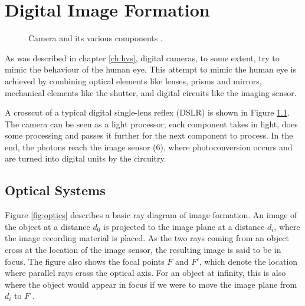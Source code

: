 \chapter{Digital Image Formation}
\label{ch:dif}

\begin{figure}
    \centering
    \caption{Camera and its various components \cite{cameracrosscut}.}
    \label{fig:camera}
\end{figure}

As was described in chapter \ref{ch:hvs}, digital cameras, to some extent, try to mimic the behaviour of the human eye. This attempt to mimic the human eye is achieved by combining optical elements like lenses, prisms and mirrors, mechanical elements like the shutter, and digital circuits like the imaging sensor. 

A crosscut of a typical digital single-lens reflex (DSLR) is shown in Figure \ref{fig:camera}. The camera can be seen as a light processor; each component takes in light, does some processing and passes it further for the next component to process. In the end, the photons reach the image sensor (6), where photoconversion occurs and are turned into digital units by the circuitry.

\section{Optical Systems}
\label{ss:optics}

Figure \ref{fig:optics} describes a basic ray diagram of image formation. An image of the object at a distance $d_0$ is projected to the image plane at a distance $d_i$, where the image recording material is placed. As the two rays coming from an object cross at the location of the image sensor, the resulting image is said to be in focus. The figure also shows the focal points $F$ and $F'$, which denote the location where parallel rays cross the optical axis. For an object at infinity, this is also where the object would appear in focus if we were to move the image plane from $d_i$ to $F$  \cite[159-183]{Hecht}.


